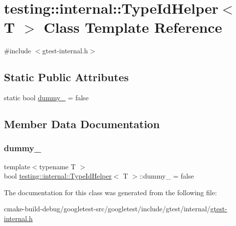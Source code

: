 \hypertarget{classtesting_1_1internal_1_1TypeIdHelper}{}\section{testing\+::internal\+::Type\+Id\+Helper$<$ T $>$ Class Template Reference}
\label{classtesting_1_1internal_1_1TypeIdHelper}


{\ttfamily \#include $<$gtest-\/internal.\+h$>$}

\subsection*{Static Public Attributes}
\begin{DoxyCompactItemize}
\item 
static bool \mbox{\hyperlink{classtesting_1_1internal_1_1TypeIdHelper_a372268b1520d965d0bdf01ebad3d270e}{dummy\+\_\+}} = false
\end{DoxyCompactItemize}


\subsection{Member Data Documentation}
\mbox{\label{classtesting_1_1internal_1_1TypeIdHelper_a372268b1520d965d0bdf01ebad3d270e}} 
\subsubsection{\texorpdfstring{dummy\_}{dummy\_}}
{\footnotesize\ttfamily template$<$typename T $>$ \\
bool \mbox{\hyperlink{classtesting_1_1internal_1_1TypeIdHelper}{testing\+::internal\+::\+Type\+Id\+Helper}}$<$ T $>$\+::dummy\+\_\+ = false\hspace{0.3cm}{\ttfamily [static]}}



The documentation for this class was generated from the following file\+:\begin{DoxyCompactItemize}
\item 
cmake-\/build-\/debug/googletest-\/src/googletest/include/gtest/internal/\mbox{\hyperlink{gtest-internal_8h}{gtest-\/internal.\+h}}\end{DoxyCompactItemize}
